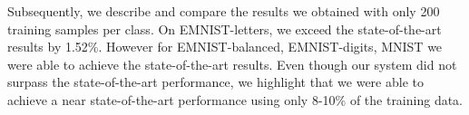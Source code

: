 Subsequently, we describe and compare the results we obtained with only 200 training samples per class. On EMNIST-letters, we exceed the state-of-the-art results by 1.52\%. However for  EMNIST-balanced, EMNIST-digits, MNIST we were able to achieve the state-of-the-art results. Even though our system did not surpass the state-of-the-art performance, we highlight that we were able to achieve a near state-of-the-art performance using only 8-10\% of the training data.  

%
%
%
%
%


